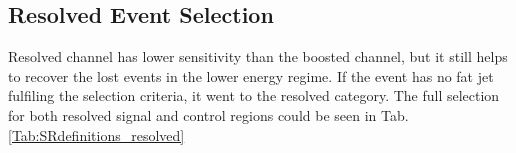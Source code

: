 \subsection{Resolved Event Selection}
Resolved channel has lower sensitivity than the boosted channel, but it still helps to recover the lost events in the lower energy regime. If the event has no fat jet fulfiling the selection criteria, it went to the resolved category. The full selection for both resolved signal and control regions could be seen in Tab. \ref{Tab:SRdefinitions_resolved}
\begin{table}[t]
	\caption{Summary of the selection criteria of of the  the resolved analysis for the $WW$ and $WZ$ signal regions (SR), $W$+jets control region (WR) and $ t\bar{t}$ control region (TR). } \label{Tab:SRdefinitions_resolved}
	\begin{center}
\end{center}
\end{table}
